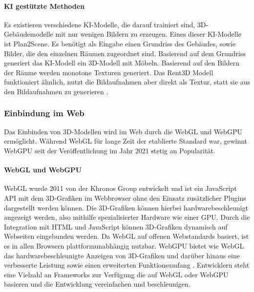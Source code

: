 \paragraph{KI gestützte Methoden}
Es existieren verschiedene \ac{KI}-Modelle, die darauf trainiert sind, 3D-Gebäudemodelle mit nur wenigen Bildern zu erzeugen. Eines dieser \ac{KI}-Modelle ist Plan2Scene. Es benötigt als Eingabe einen Grundriss des Gebäudes, sowie Bilder, die den einzelnen Räumen zugeordnet sind. Basierend auf dem Grundriss generiert das \ac{KI}-Modell ein 3D-Modell mit Möbeln. Basierend auf den Bildern der Räume werden monotone Texturen generiert.\cite[S.~10733]{Plan2Scene2021} Das Rent3D Modell funktioniert ähnlich, nutzt die Bildaufnahmen aber direkt als Textur, statt sie aus den Bildaufnahmen zu generieren \cite[S.~3413]{Rent3D2015}.

\subsubsection{Einbindung im Web}
Das Einbinden von 3D-Modellen wird im Web durch die \ac{WebGL} und WebGPU ermöglicht. Während \ac{WebGL} für lange Zeit der etablierte Standard war, gewinnt WebGPU seit der Veröffentlichung im Jahr 2021 stetig an Popularität.

\paragraph{WebGL und WebGPU}
\ac{WebGL} wurde 2011 von der Khronos Group entwickelt und ist ein JavaScript \ac{API} mit dem 3D-Grafiken im Webbrowser ohne den Einsatz zusätzlicher Plugins dargestellt werden können. Die 3D-Grafiken können hierbei hardwarebeschleunigt angezeigt werden, also mithilfe spezialisierter Hardware wie einer \ac{GPU}. Durch die Integration mit \ac{HTML} und JavaScript können 3D-Grafiken dynamisch auf Webseiten eingebunden werden. Da \ac{WebGL} auf offenen Webstandards basiert, ist es in allen Browsern plattformunabhängig nutzbar.\cite[S.~17-19]{Parisi2014} WebGPU bietet wie \ac{WebGL} das hardwarebeschleunigte Anzeigen von 3D-Grafiken und darüber hinaus eine verbesserte Leistung sowie einen erweiterten Funktionsumfang \cite{Surma2022}. Entwicklern steht eine Vielzahl an Frameworks zur Verfügung die auf \ac{WebGL} oder WebGPU basieren \cite{Seguin2024} und die Entwicklung vereinfachen und beschleunigen.

